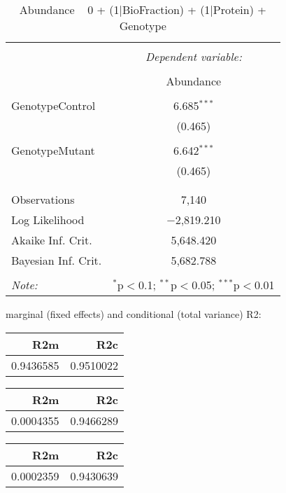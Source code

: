 \documentclass[11pt]{report}
\begin{document}
\begin{table}[!htbp] \centering 
  \caption{Abundance ~ 0 + (1|BioFraction) + (1|Protein) + Genotype} 
  \label{} 
\begin{tabular}{@{\extracolsep{5pt}}lc} 
\\[-1.8ex]\hline 
\hline \\[-1.8ex] 
 & \multicolumn{1}{c}{\textit{Dependent variable:}} \\ 
\cline{2-2} 
\\[-1.8ex] & Abundance \\ 
\hline \\[-1.8ex] 
 GenotypeControl & 6.685$^{***}$ \\ 
  & (0.465) \\ 
  & \\ 
 GenotypeMutant & 6.642$^{***}$ \\ 
  & (0.465) \\ 
  & \\ 
\hline \\[-1.8ex] 
Observations & 7,140 \\ 
Log Likelihood & $-$2,819.210 \\ 
Akaike Inf. Crit. & 5,648.420 \\ 
Bayesian Inf. Crit. & 5,682.788 \\ 
\hline 
\hline \\[-1.8ex] 
\textit{Note:}  & \multicolumn{1}{r}{$^{*}$p$<$0.1; $^{**}$p$<$0.05; $^{***}$p$<$0.01} \\ 
\end{tabular} 
\end{table} 
marginal (fixed effects) and conditional (total variance) R2:

\begin{tabular}{r|r}
\hline
R2m & R2c\\
\hline
0.9436585 & 0.9510022\\
\hline
\end{tabular}

\begin{tabular}{r|r}
\hline
R2m & R2c\\
\hline
0.0004355 & 0.9466289\\
\hline
\end{tabular}

\begin{tabular}{r|r}
\hline
R2m & R2c\\
\hline
0.0002359 & 0.9430639\\
\hline
\end{tabular}
\end{document}
